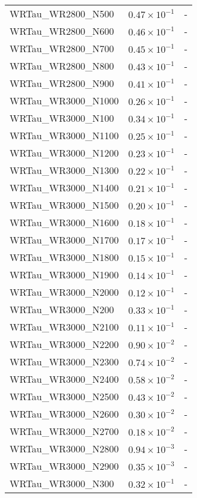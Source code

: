 \begin{longtable}[c]{| C{.35\textwidth} | C{.15\textwidth} | C{.1\textwidth}|}
    WRTau\_WR2800\_N500 & $0.47\times10^{-1}$ & - \\
    WRTau\_WR2800\_N600 & $0.46\times10^{-1}$ & - \\
    WRTau\_WR2800\_N700 & $0.45\times10^{-1}$ & - \\
    WRTau\_WR2800\_N800 & $0.43\times10^{-1}$ & - \\
    WRTau\_WR2800\_N900 & $0.41\times10^{-1}$ & - \\ \hline
    WRTau\_WR3000\_N1000 & $0.26\times10^{-1}$ & - \\
    WRTau\_WR3000\_N100 & $0.34\times10^{-1}$ & - \\
    WRTau\_WR3000\_N1100 & $0.25\times10^{-1}$ & - \\
    WRTau\_WR3000\_N1200 & $0.23\times10^{-1}$ & - \\
    WRTau\_WR3000\_N1300 & $0.22\times10^{-1}$ & - \\
    WRTau\_WR3000\_N1400 & $0.21\times10^{-1}$ & - \\
    WRTau\_WR3000\_N1500 & $0.20\times10^{-1}$ & - \\
    WRTau\_WR3000\_N1600 & $0.18\times10^{-1}$ & - \\
    WRTau\_WR3000\_N1700 & $0.17\times10^{-1}$ & - \\
    WRTau\_WR3000\_N1800 & $0.15\times10^{-1}$ & - \\
    WRTau\_WR3000\_N1900 & $0.14\times10^{-1}$ & - \\
    WRTau\_WR3000\_N2000 & $0.12\times10^{-1}$ & - \\
    WRTau\_WR3000\_N200 & $0.33\times10^{-1}$ & - \\
    WRTau\_WR3000\_N2100 & $0.11\times10^{-1}$ & - \\
    WRTau\_WR3000\_N2200 & $0.90\times10^{-2}$ & - \\
    WRTau\_WR3000\_N2300 & $0.74\times10^{-2}$ & - \\
    WRTau\_WR3000\_N2400 & $0.58\times10^{-2}$ & - \\
    WRTau\_WR3000\_N2500 & $0.43\times10^{-2}$ & - \\
    WRTau\_WR3000\_N2600 & $0.30\times10^{-2}$ & - \\
    WRTau\_WR3000\_N2700 & $0.18\times10^{-2}$ & - \\
    WRTau\_WR3000\_N2800 & $0.94\times10^{-3}$ & - \\
    WRTau\_WR3000\_N2900 & $0.35\times10^{-3}$ & - \\
    WRTau\_WR3000\_N300 & $0.32\times10^{-1}$ & - \\

\end{longtable}
